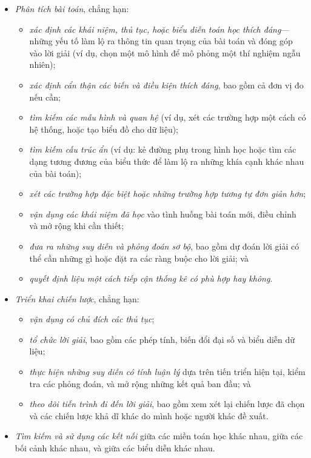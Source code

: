 \documentclass[
  10pt,
  a4paper,
  landscape,
  twoside,
  openany
]{scrbook}
\newcommand{\VI}[1]{#1}
\begin{document}
{
\VI{
  \begin{itemize}
    \item \emph{Phân tích bài toán}, chẳng hạn:
    \begin{itemize}
      \item \emph{xác định các khái niệm, thủ tục, hoặc biểu diễn toán học thích đáng}---những yếu tố làm lộ ra thông tin quan trọng của bài toán và đóng góp vào lời giải (ví dụ, chọn một mô hình để mô phỏng một thí nghiệm ngẫu nhiên);
      \item \emph{xác định cẩn thận các biến và điều kiện thích đáng}, bao gồm cả đơn vị đo nếu cần;
      \item \emph{tìm kiếm các mẫu hình và quan hệ} (ví dụ, xét các trường hợp một cách có hệ thống, hoặc tạo biểu đồ cho dữ liệu);
      \item \emph{tìm kiếm cấu trúc ẩn} (ví dụ: kẻ đường phụ trong hình học hoặc tìm các dạng tương đương của biểu thức để làm lộ ra những khía cạnh khác nhau của bài toán);
      \item \emph{xét các trường hợp đặc biệt hoặc những trường hợp tương tự đơn giản hơn};
      \item \emph{vận dụng các khái niệm đã học} vào tình huống bài toán mới, điều chỉnh và mở rộng khi cần thiết;
      \item \emph{đưa ra những suy diễn và phỏng đoán sơ bộ}, bao gồm dự đoán lời giải có thể cần những gì hoặc đặt ra các ràng buộc cho lời giải; và
      \item \emph{quyết định liệu một cách tiếp cận thống kê có phù hợp hay không}.
    \end{itemize}
    \item \emph{Triển khai chiến lược}, chẳng hạn:
    \begin{itemize}
      \item \emph{vận dụng có chủ đích các thủ tục};
      \item \emph{tổ chức lời giải}, bao gồm các phép tính, biến đổi đại số và biểu diễn dữ liệu;
      \item \emph{thực hiện những suy diễn có tính luận lý} dựa trên tiến triển hiện tại, kiểm tra các phỏng đoán, và mở rộng những kết quả ban đầu; và
      \item \emph{theo dõi tiến trình đi đến lời giải}, bao gồm xem xét lại chiến lược đã chọn và các chiến lược khả dĩ khác do mình hoặc người khác đề xuất.
    \end{itemize}
    \item \emph{Tìm kiếm và sử dụng các kết nối} giữa các miền toán học khác nhau, giữa các bối cảnh khác nhau, và giữa các biểu diễn khác nhau.

\end{itemize}}}
\end{document}
